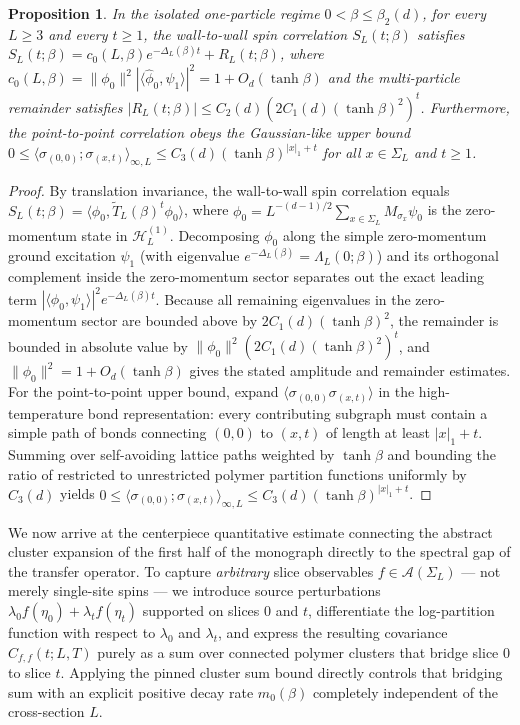 \documentclass[11pt]{article}
\newtheorem{proposition}[theorem]{Proposition}
\theoremstyle{definition}
\begin{document}
\begin{proposition}
\label{prop:s08-ornstein-zernike}
In the isolated one-particle regime $0 < \beta \le \beta_2(d)$, for every $L \ge 3$
and every $t \ge 1$, the wall-to-wall spin correlation $S_L(t; \beta)$ satisfies
$S_L(t; \beta) = c_0(L, \beta) e^{-\Delta_L(\beta) t} + R_L(t; \beta)$, where
$c_0(L, \beta) = \|\phi_0\|^2 |\langle \widehat{\phi}_0, \psi_1 \rangle|^2 = 1 +
O_d(\tanh \beta)$ and the multi-particle remainder satisfies $|R_L(t; \beta)| \le
C_2(d) (2 C_1(d) (\tanh \beta)^2)^t$. Furthermore, the point-to-point correlation
obeys the Gaussian-like upper bound $0 \le \langle \sigma_{(0,0)} ; \sigma_{(x,t)}
\rangle_{\infty, L} \le C_3(d) (\tanh \beta)^{|x|_1 + t}$ for all $x \in \Sigma_L$
and $t \ge 1$.
\end{proposition}
\begin{proof}
By translation invariance, the wall-to-wall spin correlation equals $S_L(t; \beta) =
\langle \phi_0, \widetilde{T}_L(\beta)^t \phi_0 \rangle$, where $\phi_0 =
L^{-(d-1)/2} \sum_{x \in \Sigma_L} M_{\sigma_x} \psi_0$ is the zero-momentum state
in $\mathcal{H}_L^{(1)}$. Decomposing $\phi_0$ along the simple zero-momentum ground
excitation $\psi_1$ (with eigenvalue $e^{-\Delta_L(\beta)} = \Lambda_L(0; \beta)$)
and its orthogonal complement inside the zero-momentum sector separates out the
exact leading term $|\langle \phi_0, \psi_1 \rangle|^2 e^{-\Delta_L(\beta) t}$.
Because all remaining eigenvalues in the zero-momentum sector are bounded above by
$2 C_1(d) (\tanh \beta)^2$, the remainder is bounded in absolute value by
$\|\phi_0\|^2 (2 C_1(d) (\tanh \beta)^2)^t$, and $\|\phi_0\|^2 = 1 + O_d(\tanh
\beta)$ gives the stated amplitude and remainder estimates. For the point-to-point
upper bound, expand $\langle \sigma_{(0,0)} \sigma_{(x,t)} \rangle$ in the
high-temperature bond representation: every contributing subgraph must contain a
simple path of bonds connecting $(0, 0)$ to $(x, t)$ of length at least $|x|_1 + t$.
Summing over self-avoiding lattice paths weighted by $\tanh \beta$ and bounding the
ratio of restricted to unrestricted polymer partition functions uniformly by
$C_3(d)$ yields $0 \le \langle \sigma_{(0,0)} ; \sigma_{(x,t)} \rangle_{\infty, L}
\le C_3(d) (\tanh \beta)^{|x|_1 + t}$.
\end{proof}

We now arrive at the centerpiece quantitative estimate connecting the abstract
cluster expansion of the first half of the monograph directly to the spectral gap of
the transfer operator. To capture \emph{arbitrary} slice observables $f \in
\mathcal{A}(\Sigma_L)$ --- not merely single-site spins --- we introduce source
perturbations $\lambda_0 f(\eta_0) + \lambda_t f(\eta_t)$ supported on slices $0$
and $t$, differentiate the log-partition function with respect to $\lambda_0$ and
$\lambda_t$, and express the resulting covariance $C_{f,f}(t; L, T)$ purely as a sum
over connected polymer clusters that bridge slice $0$ to slice $t$. Applying the
pinned cluster sum bound directly controls that bridging sum with an explicit
positive decay rate $m_0(\beta)$ completely independent of the cross-section $L$.
\end{document}
